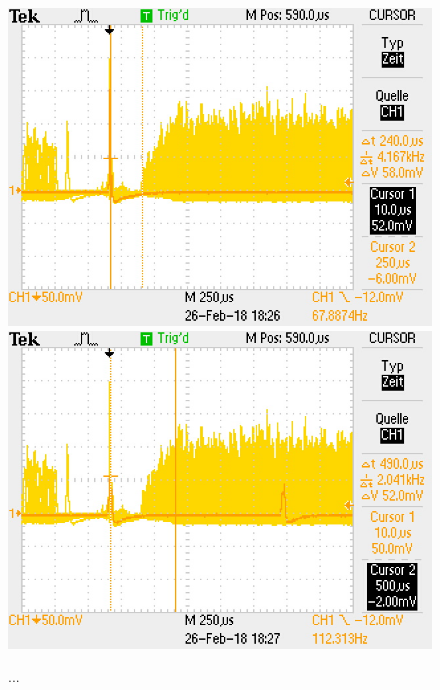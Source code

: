 \documentclass[12pt,a4paper]{article}
\begin{document}
\begin{figure}
\centering
\includegraphics[scale=0.49]{Bilder/Stever/Stever1_1.PNG}
\includegraphics[scale=0.49]{Bilder/Stever/Stever1_2.PNG}
\caption{...}
\label{fig:Stever}
\end{figure}
\end{document}
